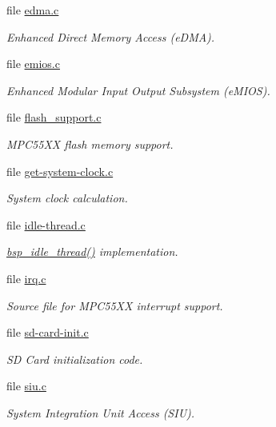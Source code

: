 \begin{DoxyCompactItemize}
file \mbox{\hyperlink{edma_8c}{edma.\+c}}
\begin{DoxyCompactList}\small\item\em Enhanced Direct Memory Access (e\+D\+MA). \end{DoxyCompactList}\item 
file \mbox{\hyperlink{emios_8c}{emios.\+c}}
\begin{DoxyCompactList}\small\item\em Enhanced Modular Input Output Subsystem (e\+M\+I\+OS). \end{DoxyCompactList}\item 
file \mbox{\hyperlink{flash__support_8c}{flash\+\_\+support.\+c}}
\begin{DoxyCompactList}\small\item\em M\+P\+C55\+XX flash memory support. \end{DoxyCompactList}\item 
file \mbox{\hyperlink{get-system-clock_8c}{get-\/system-\/clock.\+c}}
\begin{DoxyCompactList}\small\item\em System clock calculation. \end{DoxyCompactList}\item 
file \mbox{\hyperlink{idle-thread_8c}{idle-\/thread.\+c}}
\begin{DoxyCompactList}\small\item\em \mbox{\hyperlink{group__RTEMSBSPsARMLPC176X_ga301be7085b80c41a9c5887247003c662}{bsp\+\_\+idle\+\_\+thread()}} implementation. \end{DoxyCompactList}\item 
file \mbox{\hyperlink{bsps_2powerpc_2mpc55xxevb_2start_2irq_8c}{irq.\+c}}
\begin{DoxyCompactList}\small\item\em Source file for M\+P\+C55\+XX interrupt support. \end{DoxyCompactList}\item 
file \mbox{\hyperlink{sd-card-init_8c}{sd-\/card-\/init.\+c}}
\begin{DoxyCompactList}\small\item\em SD Card initialization code. \end{DoxyCompactList}\item 
file \mbox{\hyperlink{siu_8c}{siu.\+c}}
\begin{DoxyCompactList}\small\item\em System Integration Unit Access (S\+IU). \end{DoxyCompactList}\item 

\end{DoxyCompactItemize}
